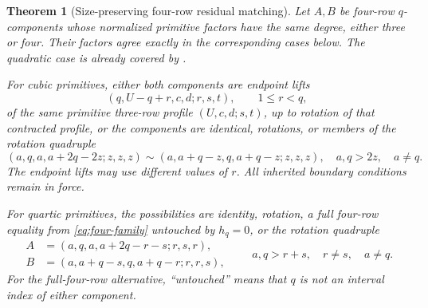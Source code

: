 \documentclass[11pt,a4paper]{amsart}
\numberwithin{equation}{section}
\theoremstyle{plain}
\newtheorem{theorem}{Theorem}[section]
\theoremstyle{definition}
\begin{document}
\begin{theorem}[Size-preserving four-row residual matching]
\label{thm:staircase-residual-matching}
Let \(A,B\) be four-row \(q\)-components whose normalized primitive
factors have the same degree, either three or four.  Their factors agree
exactly in the corresponding cases below.  The quadratic case is already
covered by .

For cubic primitives, either both components are endpoint lifts
\[
 (q,U-q+r,c,d;r,s,t),\qquad 1\le r<q,
\]
of the same primitive three-row profile \((U,c,d;s,t)\), up to rotation
of that contracted profile, or the components are identical, rotations,
or members of the rotation quadruple
\[
 (a,q,a,a+2q-2z;z,z,z)
 \sim(a,a+q-z,q,a+q-z;z,z,z),
 \quad a,q>2z,\quad a\ne q.
\]
The endpoint lifts may use different values of \(r\).  All inherited
boundary conditions remain in force.

For quartic primitives, the possibilities are identity, rotation,
a full four-row equality from \eqref{eq:four-family} untouched by
\(h_q=0\), or the rotation quadruple
\begin{equation}\label{eq:staircase-residual-family}
\begin{aligned}
 A&=(a,q,a,a+2q-r-s;r,s,r),\\
 B&=(a,a+q-s,q,a+q-r;r,r,s),
\end{aligned}
\qquad a,q>r+s,\quad r\ne s,\quad a\ne q.
\end{equation}
For the full-four-row alternative, ``untouched'' means that \(q\)
is not an interval index of either component.
\end{theorem}
\end{document}
